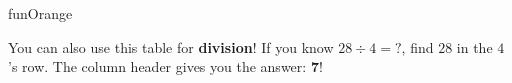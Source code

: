 {\vspace{3mm}

\begin{wbDashBox}{funOrange}
    {\color{funOrange}\faInfoCircle}\;
    \par\vspace{3pt}
    \small
    You can also use this table for \textbf{division}!
    If you know $28 \div 4 = ?$, find $28$ in the $4$'s row.
    The column header gives you the answer: $\mathbf{7}$!
\end{wbDashBox}

}

\newpage

